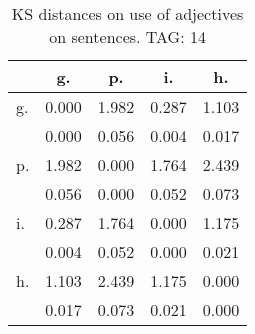 \begin{table}[h!]
\begin{center}
\begin{tabular}{| l | c | c | c | c |}\hline
 & g. & p. & i. & h. \\\hline
g. & 0.000  & 1.982  & 0.287  & 1.103 \\\hline
 & 0.000  & 0.056  & 0.004  & 0.017 \\\hline
p. & 1.982  & 0.000  & 1.764  & 2.439 \\\hline
 & 0.056  & 0.000  & 0.052  & 0.073 \\\hline
i. & 0.287  & 1.764  & 0.000  & 1.175 \\\hline
 & 0.004  & 0.052  & 0.000  & 0.021 \\\hline
h. & 1.103  & 2.439  & 1.175  & 0.000 \\\hline
 & 0.017  & 0.073  & 0.021  & 0.000 \\\hline
\end{tabular}
\caption{KS distances on use of adjectives on sentences. TAG: 14}
\end{center}
\end{table}